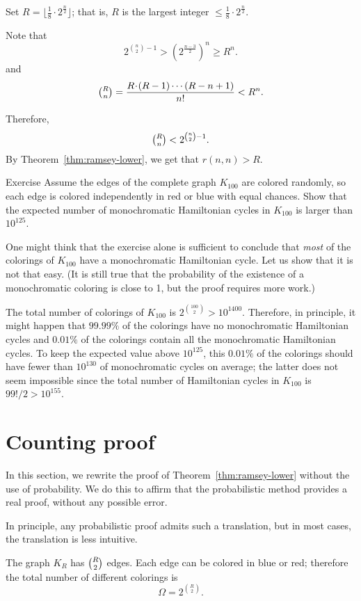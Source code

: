 Set $R=\lfloor\tfrac1{8}\cdot 2^{\frac{n}{2}}\rfloor$;
that is, $R$ is the largest integer $\le\tfrac1{8}\cdot 2^{\frac{n}{2}}$.

Note that 
\[2^{\binom n 2 - 1}> (2^{\frac{n-3}2})^n\ge R^n.\]
and
\[\tbinom R n=\frac{R\cdot(R-1)\cdots (R-n+1)}{n!}<  R^n.\]

Therefore,  
\[\tbinom R n<2^{\binom n 2 - 1}.\]
By Theorem~\ref{thm:ramsey-lower}, we get that $r(n,n)> R$.
\qeds

\begin{thm}{Exercise}\label{ex:number(ham-cycles)}
Assume the edges of the complete graph $K_{100}$ are colored randomly,
so each edge is colored independently in red or blue with equal chances. 
Show that the expected number of monochromatic Hamiltonian cycles in $K_{100}$ is larger than $10^{125}$.
\end{thm} 

One might think that the exercise alone is sufficient to conclude that \textit{most} of the colorings of $K_{100}$ have a monochromatic Hamiltonian cycle.
Let us show that it is not that easy.
(It is still true that the probability of the existence of a monochromatic coloring is close to 1, but the proof requires more work.)

The total number of colorings of $K_{100}$ is $2^{\binom{100}2}>10^{1400}$.
Therefore, in principle, it might happen that $99.99\%$ of the colorings have no monochromatic Hamiltonian cycles and $0.01\%$ of the colorings contain all the monochromatic Hamiltonian cycles.
To keep the expected value above $10^{125}$,
this $0.01\%$ of the colorings should have fewer than $10^{130}$ of monochromatic cycles on average;
the latter does not seem impossible since the total number of Hamiltonian cycles in $K_{100}$ is $99!/2>10^{155}$.

\section{Counting proof}

In this section, we rewrite the proof of Theorem~\ref{thm:ramsey-lower} without the use of probability.
We do this to affirm that the probabilistic method provides a real proof, without any possible error.

In principle,  any probabilistic proof admits such a translation,
but in most cases, the translation is less intuitive. 

The graph $K_R$ has $\tbinom{R}{2}$ edges.
Each edge can be colored in blue or red;
therefore the total number of different colorings is \[\Omega=2^{\binom{R}{2}}.\]

